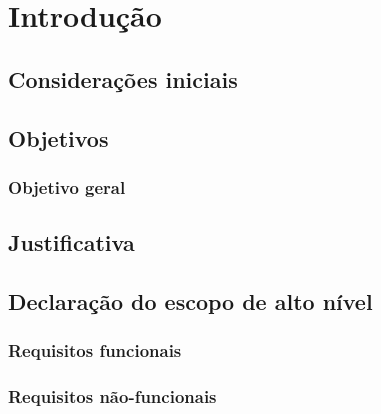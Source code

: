 
\chapter{Introdução}\label{cap:introducao}

\section{\textbf{Considerações iniciais}}


\section{\textbf{Objetivos}}


\subsection{Objetivo geral}

\section{\textbf{Justificativa}}


\section{\textbf{Declaração do escopo de alto nível}}


\subsection{Requisitos funcionais}


\subsection{Requisitos não-funcionais}


